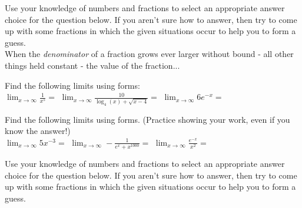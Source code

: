 \documentclass[10pt]{article}
\begin{document}
 Use your knowledge of numbers and fractions to select an appropriate answer choice for the question below. If you aren't sure how to answer, then try to come up with some fractions in which the given situations occur to help you to form a guess.\\

When the {\it denominator} of a fraction grows ever larger without bound - all other things held constant - the value of the fraction...\\
    
\newpage

 Find the following limits using forms:\\

$\displaystyle\lim_{x\to\infty} \frac{1}{x^5}=$ 
\hfill 
$\displaystyle\lim_{x\to\infty} \frac{10}{\log_4(x)+\sqrt{x-4}}=$ 
\hfill $\displaystyle\lim_{x\to\infty} 6e^{-x}=$ 
\hfill

\vfill

 Find the following limits using forms. (Practice showing your work, even if you know the answer!)\\

$\displaystyle\lim_{x\to\infty} 5x^{-3}=$ 
\hfill 
$\displaystyle\lim_{x\to\infty} -\frac{1}{e^x+x^{1000}}=$ 
\hfill $\displaystyle\lim_{x\to\infty} \frac{e^{-x}}{x^2} =$ 
\hfill

\vfill


\lform  {}


 Use your knowledge of numbers and fractions to select an appropriate answer choice for the question below. If you aren't sure how to answer, then try to come up with some fractions in which the given situations occur to help you to form a guess.\\
\end{document}
